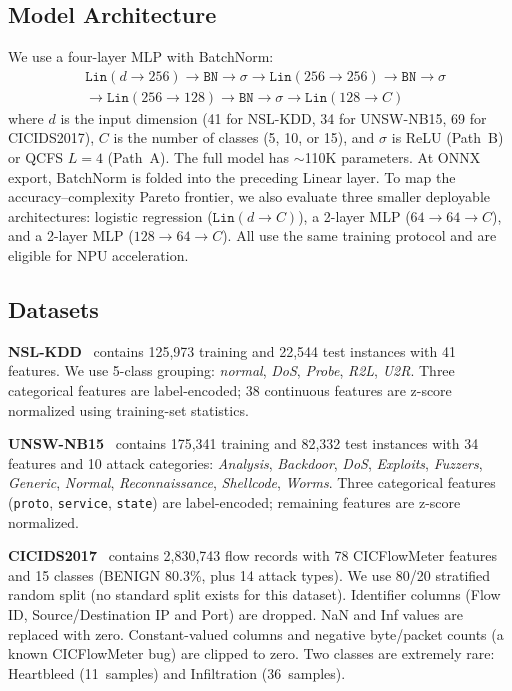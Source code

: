 \documentclass[10pt,twocolumn]{article}
\begin{document}
\subsection{Model Architecture}

We use a four-layer MLP with BatchNorm:
%
\begin{align*}
  &\texttt{Lin}(d {\to} 256) \to \texttt{BN} \to \sigma \to
   \texttt{Lin}(256 {\to} 256) \to \texttt{BN} \to \sigma \\
  &\to \texttt{Lin}(256 {\to} 128) \to \texttt{BN} \to \sigma \to
   \texttt{Lin}(128 {\to} C)
\end{align*}
%
where $d$ is the input dimension (41 for NSL-KDD, 34 for UNSW-NB15,
69 for CICIDS2017),
$C$ is the number of classes (5, 10, or 15),
and $\sigma$ is ReLU (Path~B) or QCFS $L{=}4$ (Path~A).
The full model has ${\sim}$110K parameters.
At ONNX export, BatchNorm is folded into the preceding Linear layer.
To map the accuracy--complexity Pareto frontier, we also evaluate
three smaller deployable architectures: logistic regression
($\texttt{Lin}(d{\to}C)$), a 2-layer MLP ($64{\to}64{\to}C$),
and a 2-layer MLP ($128{\to}64{\to}C$).
All use the same training protocol and are eligible for NPU
acceleration.

\subsection{Datasets}

\textbf{NSL-KDD}~\cite{tavallaee2009nslkdd} contains 125,973 training and
22,544 test instances with 41 features. We use 5-class grouping:
\textit{normal}, \textit{DoS}, \textit{Probe}, \textit{R2L}, \textit{U2R}.
Three categorical features are label-encoded; 38 continuous features
are z-score normalized using training-set statistics.

\textbf{UNSW-NB15}~\cite{moustafa2015unsw} contains 175,341 training and
82,332 test instances with 34 features and 10 attack categories:
\textit{Analysis}, \textit{Backdoor}, \textit{DoS}, \textit{Exploits},
\textit{Fuzzers}, \textit{Generic}, \textit{Normal},
\textit{Reconnaissance}, \textit{Shellcode}, \textit{Worms}.
Three categorical features (\texttt{proto}, \texttt{service},
\texttt{state}) are label-encoded; remaining features are z-score
normalized.

\textbf{CICIDS2017}~\cite{sharafaldin2018cicids} contains 2,830,743
flow records with 78 CICFlowMeter features and 15 classes (BENIGN
80.3\%, plus 14 attack types). We use 80/20 stratified random split
(no standard split exists for this dataset).
Identifier columns (Flow ID, Source/Destination IP and Port) are
dropped. NaN and Inf values are replaced with zero.
Constant-valued columns and negative byte/packet counts (a known
CICFlowMeter bug) are clipped to zero.
Two classes are extremely rare: Heartbleed (11~samples) and
Infiltration (36~samples).
\end{document}
